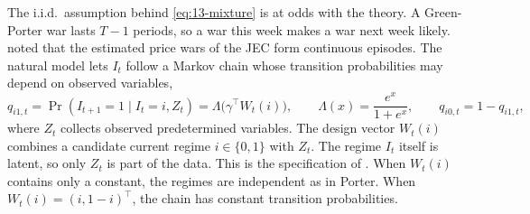 The i.i.d.\ assumption behind \eqref{eq:13-mixture} is at odds with the theory. A Green-Porter war lasts $T-1$ periods,
so a war this week makes a war next week likely. \citet{CosslettLee1985} noted that the estimated price wars of the
JEC form continuous episodes. The natural model lets $I_t$ follow a Markov chain whose
transition probabilities may depend on observed variables,
\begin{equation}\label{eq:13-logit-transition}
  q_{i1,t} = \Pr(I_{t+1} = 1 \mid I_t = i, Z_t) = \Lambda\bigl(\gamma^\top W_t(i)\bigr), \qquad
  \Lambda(x) = \frac{e^{x}}{1 + e^{x}}, \qquad q_{i0,t} = 1 - q_{i1,t},
\end{equation}
where $Z_t$ collects observed predetermined variables. The design vector $W_t(i)$ combines a candidate current
regime $i \in \{0,1\}$ with $Z_t$. The regime $I_t$ itself is latent, so only $Z_t$ is part of the data. This is
the specification of \citet[eq.~(4)]{Ellison1994}. When $W_t(i)$ contains only a constant, the regimes are
independent as in Porter. When $W_t(i) = (i, 1 - i)^\top$, the chain has constant transition probabilities.

